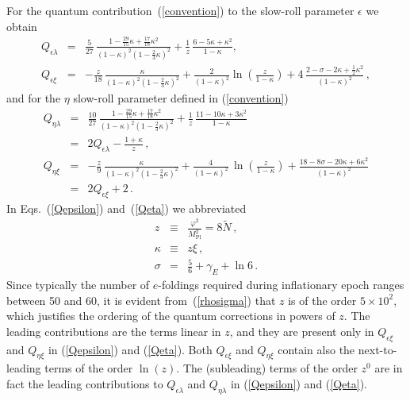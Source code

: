  For the quantum contribution~(\ref{convention}) to the slow-roll parameter
$\epsilon$ we obtain
\begin{eqnarray}
Q_{\epsilon\lambda} &=& \frac{5}{27}\,\frac{1-\frac{29}{15}\kappa
+ \frac{17}{18}\kappa^2}{(1-\kappa)^2(1-\frac{2}{3}\kappa)^2} +
\frac{1}{z}\,\frac{6-5\kappa
+\kappa^2}{1-\kappa},\nonumber\\
Q_{\epsilon\xi} &=&
-\frac{z}{18}\,\frac{\kappa}{(1-\kappa)^2(1-\frac{2}{3}\kappa)^2}
+ \frac{2}{(1-\kappa)^2}\ln\left(\frac{z}{1-\kappa}\right)
+ 4\,\frac{2-\sigma-2\kappa +
\frac{1}{2}\kappa^2}{(1-\kappa)^2}
\,,
\label{Qepsilon}
\end{eqnarray}
and for the $\eta$ slow-roll parameter defined in
(\ref{convention})
\begin{eqnarray}
Q_{\eta\lambda} &=& \frac{10}{27}\,\frac{1-\frac{29}{15}\kappa
+\frac{17}{18}\kappa^2}{(1-\kappa)^2(1-\frac{2}{3}\kappa)^2}+\frac{1}{z}\,\frac{11-10\kappa +3\kappa^2}{1-\kappa}\nonumber\\
&=&2 Q_{\epsilon\lambda}-\frac{1+\kappa}{z}\nonumber\,,
\label{Qeta}
\\
Q_{\eta\xi} &=&
-\frac{z}{9}\,\frac{\kappa}{(1-\kappa)^2(1-\frac{2}{3}\kappa)^2} + \frac{4}{(1-\kappa)^2}\,\ln\left(\frac{z}{1-\kappa}\right) + \frac{18-8\sigma-20\kappa +6\kappa^2}{(1-\kappa)^2}\nonumber\\
&=& 2 Q_{\epsilon\xi} + 2
\,.
\end{eqnarray}
In Eqs.~(\ref{Qepsilon}) and~(\ref{Qeta}) we abbreviated
\begin{eqnarray}
z &\equiv& \frac{\varphi^2}{M^2_{\mathrm{Pl}}} =
8\tilde{N}\,,\nonumber\\
\kappa &\equiv& z\xi \,,
\nonumber\\
\sigma 
      &=& \frac56 +\gamma_E + \ln 6
\,.
\label{rhosigma}
\end{eqnarray}
Since typically the number of $e$-foldings required during
inflationary epoch ranges between 50 and 60, it is evident
from~(\ref{rhosigma}) that $z$ is of the order $5\times 10^2$, which
justifies the ordering of the quantum corrections in powers of $z$.
The leading contributions are the terms linear in $z$, and they
are present only in $Q_{\epsilon\xi}$ and $Q_{\eta\xi}$ in (\ref{Qepsilon})
and (\ref{Qeta}). Both $Q_{\epsilon\xi}$ and $Q_{\eta\xi}$
contain also the next-to-leading terms of the order $\ln(z)$.
The (subleading) terms of the order $z^0$ are in fact the leading
contributions to $Q_{\epsilon\lambda}$ and
$Q_{\eta\lambda}$ in (\ref{Qepsilon}) and (\ref{Qeta}).


